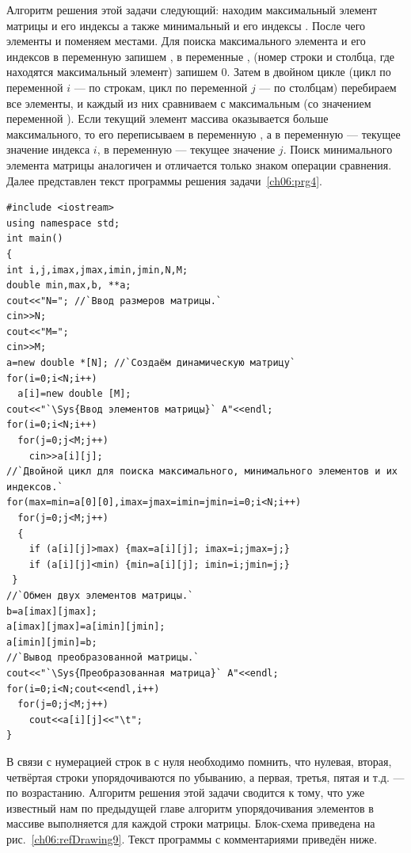 
Алгоритм решения этой задачи следующий: находим максимальный элемент матрицы  и его индексы
 а также минимальный  и его индексы . После
чего элементы  и  поменяем местами. Для поиска максимального 
элемента и его индексов в
переменную  запишем , в переменные ,  (номер
строки и столбца, где находятся максимальный элемент) запишем 0. Затем в двойном цикле 
(цикл по переменной $i$ ---
по строкам, цикл по переменной $j$ --- по столбцам) перебираем все элементы, и каждый из них сравниваем с
максимальным (со значением переменной ). Если текущий элемент массива оказывается больше
максимального, то его переписываем в переменную , а в переменную  --- текущее
значение индекса $i$, в переменную  --- текущее значение $j$. Поиск минимального элемента
матрицы аналогичен и отличается только знаком операции сравнения. 
Далее представлен текст программы решения задачи~\ref{ch06:prg4}.
\begin{lstlisting}
#include <iostream>
using namespace std;
int main()
{
int i,j,imax,jmax,imin,jmin,N,M;
double min,max,b, **a; 
cout<<"N="; //`Ввод размеров матрицы.`
cin>>N;
cout<<"M=";
cin>>M;
a=new double *[N]; //`Создаём динамическую матрицу`
for(i=0;i<N;i++)
  a[i]=new double [M];
cout<<"`\Sys{Ввод элементов матрицы}` A"<<endl;
for(i=0;i<N;i++)
  for(j=0;j<M;j++)
    cin>>a[i][j];
//`Двойной цикл для поиска максимального, минимального элементов и их индексов.`
for(max=min=a[0][0],imax=jmax=imin=jmin=i=0;i<N;i++)
  for(j=0;j<M;j++)
  {
    if (a[i][j]>max) {max=a[i][j]; imax=i;jmax=j;}
    if (a[i][j]<min) {min=a[i][j]; imin=i;jmin=j;}
 }
//`Обмен двух элементов матрицы.`
b=a[imax][jmax];
a[imax][jmax]=a[imin][jmin];
a[imin][jmin]=b;
//`Вывод преобразованной матрицы.` 
cout<<"`\Sys{Преобразованная матрица}` A"<<endl;
for(i=0;i<N;cout<<endl,i++)
  for(j=0;j<M;j++)
    cout<<a[i][j]<<"\t";
}
\end{lstlisting}


В связи с нумерацией строк в  с нуля необходимо помнить, что нулевая, 
вторая, четвёртая строки упорядочиваются по
убыванию, а первая, третья, пятая и т.д. --- по возрастанию. Алгоритм решения 
этой задачи сводится к тому, что уже
известный нам по предыдущей главе алгоритм упорядочивания элементов в массиве 
выполняется для каждой строки матрицы.
Блок-схема приведена на рис.~\ref{ch06:refDrawing9}. Текст программы с комментариями приведён ниже.

